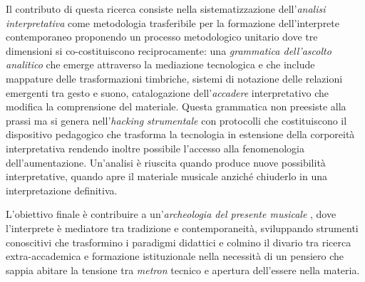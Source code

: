 \documentclass[11pt]{article}
\begin{document}
Il contributo di questa ricerca consiste nella sistematizzazione dell'\textit{analisi interpretativa} come metodologia trasferibile per la formazione dell'interprete contemporaneo %
proponendo un processo metodologico unitario dove tre dimensioni si co-costituiscono reciprocamente: una \emph{grammatica dell'ascolto analitico} che emerge attraverso la mediazione tecnologica %
e che include mappature delle trasformazioni timbriche, sistemi di notazione delle relazioni emergenti tra gesto e suono, catalogazione dell'\emph{accadere} interpretativo che modifica la comprensione del materiale. Questa grammatica non preesiste alla prassi ma si genera nell'\emph{hacking strumentale} con protocolli che costituiscono il dispositivo pedagogico che trasforma la tecnologia in estensione della corporeità interpretativa rendendo inoltre possibile l'accesso alla fenomenologia dell'aumentazione. %
Un'analisi è riuscita quando produce nuove possibilità interpretative, quando apre il materiale musicale anziché chiuderlo in una interpretazione definitiva. %

L'obiettivo finale è contribuire a un'\emph{archeologia del presente musicale} \citep{agamben2008apparatus}, dove l'interprete è mediatore tra tradizione e contemporaneità, sviluppando strumenti conoscitivi che trasformino i paradigmi didattici e colmino il divario tra ricerca extra-accademica e formazione istituzionale nella necessità di un pensiero che sappia abitare la tensione tra \textit{metron} tecnico e apertura dell'essere nella materia.
\end{document}
